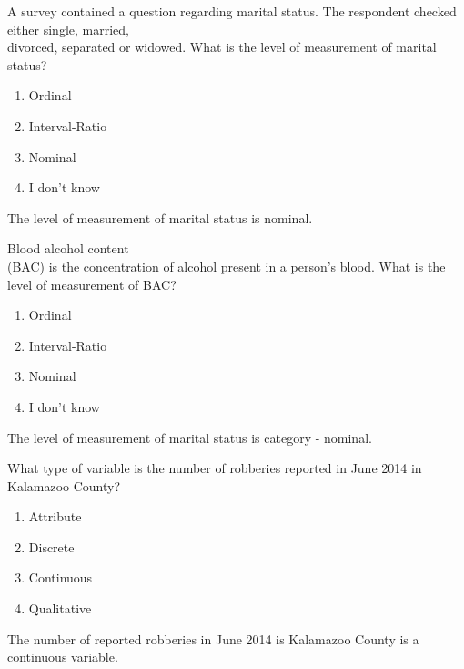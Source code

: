 \documentclass[11pt, chapterprefix=true]{scrbook}\usepackage[]{graphicx}\usepackage[]{color}
\begin{document}
\begin{exercises}
\begin{exercise}
  A survey contained a question regarding marital status.  The respondent checked either single, married, \\ divorced, separated or widowed.  What is the level of measurement of marital status?
	  \begin{enumerate}
	  \item Ordinal
	  \item Interval-Ratio
	  \item Nominal
	  \item I don't know
	  \end{enumerate}
	  \vspace{3mm}
	\end{exercise}
	\vspace{2mm}
	\begin{solution}
	  The level of measurement of marital status is nominal.
	\end{solution}

  \begin{exercise} %

  Blood alcohol content \\ (BAC) is the concentration of alcohol present in a person's blood.  What is the level of measurement of BAC?
	  \begin{enumerate}
	  \samepage
	  \item Ordinal
	  \samepage
  	\item Interval-Ratio
  	\samepage
	  \item Nominal
	  \samepage
	  \item I don't know
	  \samepage
	  \end{enumerate}
	  \samepage
	  \vspace{3mm}
	\end{exercise}
	\vspace{2mm}
	\begin{solution}
	  The level of measurement of marital status is category - nominal.
	\end{solution}

  \begin{exercise}  %

  What type of variable is the number of robberies reported in June 2014 in Kalamazoo County?
	  \begin{enumerate}
  	\samepage
  	\item Attribute
  	\samepage
  	\item Discrete
  	\samepage
  	\item Continuous
  	\samepage
  	\item Qualitative
  	\end{enumerate}
  	\vspace{3mm}
  \end{exercise}
  \vspace{2mm}
	\begin{solution}
	  The number of reported robberies in June 2014 is Kalamazoo County is a continuous variable.
	\end{solution}


\end{exercises}
\end{document}
